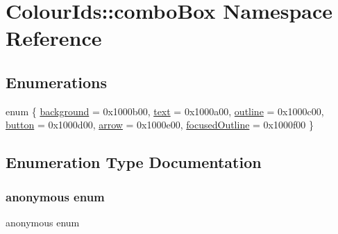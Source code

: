 \hypertarget{namespaceColourIds_1_1comboBox}{}\section{Colour\+Ids\+:\+:combo\+Box Namespace Reference}
\label{namespaceColourIds_1_1comboBox}
\subsection*{Enumerations}
\begin{DoxyCompactItemize}
\item 
enum \{ \newline
\mbox{\hyperlink{namespaceColourIds_1_1comboBox_aac951712761c4c5f687be5f7c9ec5b32aa487ed0cbcd7cfb5210407799f455146}{background}} = 0x1000b00, 
\mbox{\hyperlink{namespaceColourIds_1_1comboBox_aac951712761c4c5f687be5f7c9ec5b32a67a0f515d6fb9f97f8a6262163720394}{text}} = 0x1000a00, 
\mbox{\hyperlink{namespaceColourIds_1_1comboBox_aac951712761c4c5f687be5f7c9ec5b32aa50889177ffccd3acaf65fa9908965af}{outline}} = 0x1000c00, 
\mbox{\hyperlink{namespaceColourIds_1_1comboBox_aac951712761c4c5f687be5f7c9ec5b32aaa326953042fa5742b559523c7346af5}{button}} = 0x1000d00, 
\newline
\mbox{\hyperlink{namespaceColourIds_1_1comboBox_aac951712761c4c5f687be5f7c9ec5b32a72e49ec38ff4542d8da2cc13f2384e16}{arrow}} = 0x1000e00, 
\mbox{\hyperlink{namespaceColourIds_1_1comboBox_aac951712761c4c5f687be5f7c9ec5b32ac70dd34823a04e4993a96707a1ce87bb}{focused\+Outline}} = 0x1000f00
 \}
\end{DoxyCompactItemize}


\subsection{Enumeration Type Documentation}
\mbox{\label{namespaceColourIds_1_1comboBox_aac951712761c4c5f687be5f7c9ec5b32}} 
\subsubsection{\texorpdfstring{anonymous enum}{anonymous enum}}
{\footnotesize\ttfamily anonymous enum}

